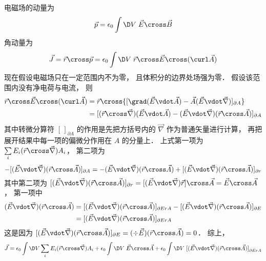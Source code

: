 
电磁场的动量为
\begin{equation}
\vec p = {\epsilon_0}\int {\D V\;\vec E \cross \vec B}
\end{equation}
角动量为
\begin{equation}
\vec J = \vec r \cross \vec p = {\epsilon_0}\int {\D V\;\vec r \cross \vec E \cross (\curl \vec A)} 
\end{equation}
现在假设电磁场只在一定范围内不为零， 且体积分的边界处场强为零． 假设该范围内没有净电荷与电流， 则
\begin{equation}
\begin{aligned}
  \vec r \cross \vec E \cross (\curl \vec A) &= \vec r \cross {[\grad (\vec E \vdot \vec A) - \vec A(\vec E \vdot \vec\nabla )]_{\partial A}} \\
  &= {[(\vec r \cross \vec\nabla )(\vec E \vdot \vec A) - (\vec E \vdot \vec\nabla )(\vec r \cross \vec A)]_{\partial A}}
\end{aligned}
\end{equation}
其中转微分算符 ${[\,]_{\partial A}}$ 的作用是先把方括号内的 $\vec\nabla$ 作为普通矢量进行计算， 再把展开结果中每一项的偏微分作用在 $A$ 的分量上． 上式第一项为 $\sum\limits_i {{E_i}} (\vec r \cross \vec\nabla ){A_i}$， 第二项为
\begin{equation}
   - {[(\vec E \vdot \vec\nabla )(\vec r \cross \vec A)]_{\partial A}} =  - (\vec E \vdot \vec\nabla )(\vec r \cross \vec A) + {[(\vec E \vdot \vec\nabla )(\vec r \cross \vec A)]_{\partial r}}
\end{equation}
其中第二项为 ${[(\vec E \vdot \vec\nabla )(\vec r \cross \vec A)]_{\partial r}} = [(\vec E \vdot \vec\nabla )\vec r] \cross \vec A = \vec E \cross \vec A$， 第一项中
\begin{equation}
\begin{aligned}
  (\vec E \vdot \vec\nabla )(\vec r \cross \vec A) &= {[(\vec E \vdot \vec\nabla )(\vec r \cross \vec A)]_{\partial ErA}} - {[(\vec E \vdot \vec\nabla )(\vec r \cross \vec A)]_{\partial E}}\\
  & = {[(\vec E \vdot \vec\nabla )(\vec r \cross \vec A)]_{\partial ErA}}
  \end{aligned}
\end{equation}
这是因为 ${[(\vec E \vdot \vec\nabla )(\vec r \cross \vec A)]_{\partial E}} = (\div\vec E)(\vec r \cross \vec A) = 0$．  综上，
\begin{equation}
\vec J = {\epsilon_0}\int {\D V\sum\limits_i {{E_i}} (\vec r \cross \vec\nabla ){A_i} + {\epsilon_0}\int {\D V\;\vec E \cross \vec A} }  + {\epsilon_0}\int {\D V\;{{[(\vec E \vdot \vec\nabla )(\vec r \cross \vec A)]}_{\partial ErA}}}
\end{equation}

